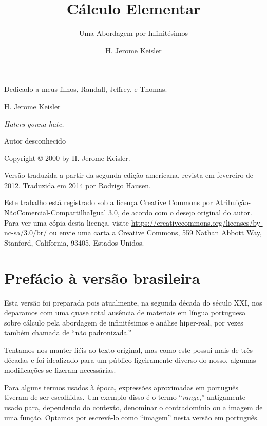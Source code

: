 \documentclass{svmono}
\title{Cálculo Elementar}
\subtitle{Uma Abordagem por Infinitésimos}
\author{H. Jerome Keisler}
\begin{document}
\maketitle

\frontmatter

\newpage

\setcounter{page}{3}

Dedicado a meus filhos, Randall, Jeffrey, e Thomas.

\hfill H. Jerome Keisler

\vfill

\emph{Haters gonna hate.}

\hfill Autor desconhecido

\vfill

Copyright © 2000 by H. Jerome Keisler.

Versão traduzida a partir da segunda edição americana, revista
em fevereiro de 2012. Traduzida em 2014 por Rodrigo Hausen.

Este trabalho está registrado sob a licença Creative Commons
por Atribuição-NãoComercial-CompartilhaIgual 3.0, de acordo
com o desejo original do autor. Para ver uma cópia desta licença,
visite \url{https://creativecommons.org/licenses/by-nc-sa/3.0/br/}
ou envie uma carta a Creative Commons, 559 Nathan
Abbott Way, Stanford, California, 93405, Estados Unidos.

\newpage

\chapter*{Prefácio à versão brasileira}

Esta versão foi preparada pois atualmente, na segunda década do século XXI,
nos deparamos com uma quase total ausência de materiais em língua portuguesa
sobre cálculo pela abordagem de infinitésimos e análise hiper-real, por
vezes também chamada de ``não padronizada.''

Tentamos nos manter fiéis ao texto original, mas como este
possui mais de três décadas e foi idealizado para um público ligeiramente
diverso do nosso, algumas modificações se fizeram necessárias.

Para alguns termos usados à época, expressões aproximadas em português
tiveram de ser escolhidas. Um exemplo disso é
o termo ``\emph{range},'' antigamente usado para, dependendo
do contexto, denominar o contradomínio ou a imagem de uma função.
Optamos por escrevê-lo como ``imagem'' nesta versão em português.
\end{document}
